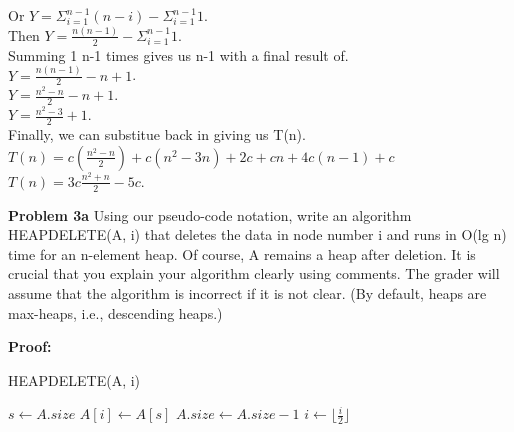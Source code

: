 \documentclass[12pt]{article}
\begin{document}
Or $Y = \Sigma^{n - 1}_{i = 1} (n - i) - \Sigma^{n - 1}_{i = 1} 1$.\\
Then $Y = \frac{n(n - 1)}{2} - \Sigma^{n - 1}_{i = 1} 1$.\\
Summing 1 n-1 times gives us n-1 with a final result of.\\
$Y = \frac{n(n - 1)}{2} - n + 1$.\\
$Y = \frac{n^{2} - n}{2} - n + 1$.\\
$Y = \frac{n^{2} - 3}{2} + 1$.\\
Finally, we can substitue back in giving us T(n).\\
$T(n) = c(\frac{n^{2} - n}{2}) + c(n^{2} - 3n) + 2c + cn + 4c(n - 1) + c$
$T(n) = 3c\frac{n^{2} + n}{2} - 5c$.\\


\rightline{$\blacksquare$}

\par

\par
\bigskip
{\bf Problem
    3a
}
Using our pseudo-code notation, write an algorithm HEAPDELETE(A, i) that
deletes the data in node number i and runs in O(lg n) time for an n-element
heap. Of course, A remains a heap after deletion.
It is crucial that you explain your algorithm clearly using comments. The grader
will assume that the algorithm is incorrect if it is not clear.
(By default, heaps are max-heaps, i.e., descending heaps.)

\par
\bigskip
{\bf Proof:}
\par
\hline
HEAPDELETE(A, i)
\hline
\begin{algorithmic}
    \State $s \gets A.size$
    \State $A[i] \gets A[s]$ 
    \State $A.size \gets A.size - 1$ 
     
         
        \state $i \gets \lfloor\frac{i}{2}\rfloor$ 
\end{algorithmic}
\end{document}

